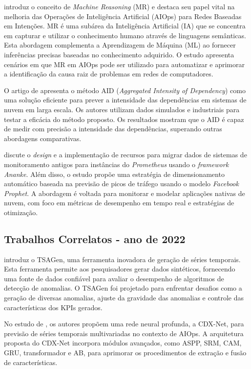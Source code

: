 \cite{9605403} introduz o conceito de \textit{Machine Reasoning} (MR) e destaca seu papel vital na melhoria das Operações de Inteligência Artificial (AIOps) para Redes Baseadas em Intenções. MR é uma subárea da Inteligência Artificial (IA) que se concentra em capturar e utilizar o conhecimento humano através de linguagens semânticas. Esta abordagem complementa a Aprendizagem de Máquina (ML) ao fornecer inferências precisas baseadas no conhecimento adquirido. O estudo apresenta cenários em que MR em AIOps pode ser utilizado para automatizar e aprimorar a identificação da causa raiz de problemas em redes de computadores.

O artigo de \cite{9678534} apresenta o método AID (\textit{Aggregated Intensity of Dependency}) como uma solução eficiente para prever a intensidade das dependências em sistemas de nuvem em larga escala. Os autores utilizam dados simulados e industriais para testar a eficácia do método proposto. Os resultados mostram que o AID é capaz de medir com precisão a intensidade das dependências, superando outras abordagens comparativas.

\cite{9680514} discute o \textit{design} e a implementação de recursos para migrar dados de sistemas de monitoramento antigos para instâncias do \textit{Prometheus} usando o \textit{framework Ananke}. Além disso, o estudo propõe uma estratégia de dimensionamento automático baseada na previsão de picos de tráfego usando o modelo \textit{Facebook} \textit{Prophet}. A abordagem é voltada para monitorar e modelar aplicações nativas de nuvem, com foco em métricas de desempenho em tempo real e estratégias de otimização.

\subsection{Trabalhos Correlatos - ano de 2022}\label{trab_correlatos_22}

\cite{9492267} introduz o TSAGen, uma ferramenta inovadora de geração de séries temporais. Esta ferramenta permite aos pesquisadores gerar dados sintéticos, fornecendo uma fonte de dados confiável para avaliar o desempenho de algoritmos de detecção de anomalias. O TSAGen foi projetado para enfrentar desafios como a geração de diversas anomalias, ajuste da gravidade das anomalias e controle das características dos KPIs gerados.

No estudo de \cite{9746242}, os autores propõem uma rede neural profunda, a CDX-Net, para previsão de séries temporais multivariadas no contexto de AIOps. A arquitetura proposta do CDX-Net incorpora módulos avançados, como ASPP, SRM, CAM, GRU, transformador e AB, para aprimorar os procedimentos de extração e fusão de características.

